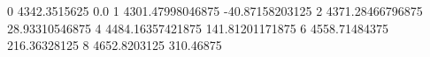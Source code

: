 0 4342.3515625 0.0
1 4301.47998046875 -40.87158203125
2 4371.28466796875 28.93310546875
4 4484.16357421875 141.81201171875
6 4558.71484375 216.36328125
8 4652.8203125 310.46875
